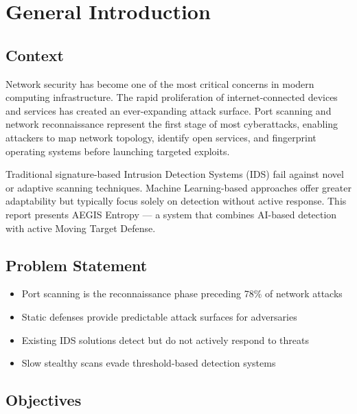 
\chapter{General Introduction}

\section{Context}

Network security has become one of the most critical concerns in modern computing infrastructure. The rapid proliferation of internet-connected devices and services has created an ever-expanding attack surface. Port scanning and network reconnaissance represent the first stage of most cyberattacks, enabling attackers to map network topology, identify open services, and fingerprint operating systems before launching targeted exploits.

Traditional signature-based Intrusion Detection Systems (IDS) fail against novel or adaptive scanning techniques. Machine Learning-based approaches offer greater adaptability but typically focus solely on detection without active response. This report presents AEGIS Entropy --- a system that combines AI-based detection with active Moving Target Defense.

\section{Problem Statement}

\begin{itemize}
    \item Port scanning is the reconnaissance phase preceding 78\% of network attacks
    \item Static defenses provide predictable attack surfaces for adversaries
    \item Existing IDS solutions detect but do not actively respond to threats
    \item Slow stealthy scans evade threshold-based detection systems
\end{itemize}

\section{Objectives}

